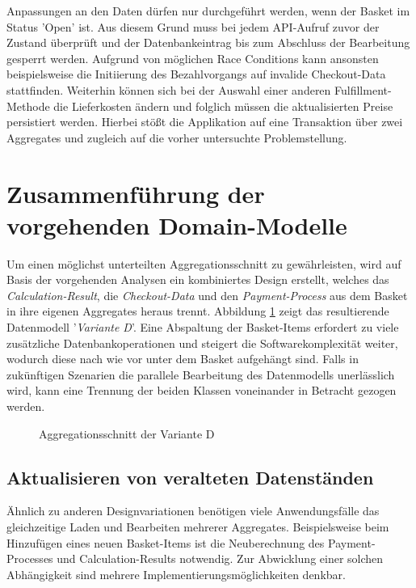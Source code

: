 Anpassungen an den Daten dürfen nur durchgeführt werden, wenn der Basket im Status 'Open' ist. Aus diesem Grund muss bei jedem API-Aufruf zuvor der Zustand überprüft und der Datenbankeintrag bis zum Abschluss der Bearbeitung gesperrt werden. Aufgrund von möglichen Race Conditions kann ansonsten beispielsweise die Initiierung des Bezahlvorgangs auf invalide Checkout-Data stattfinden. Weiterhin können sich bei der Auswahl einer anderen Fulfillment-Methode die Lieferkosten ändern und folglich müssen die aktualisierten Preise persistiert werden. Hierbei stößt die Applikation auf eine Transaktion über zwei Aggregates und zugleich auf die vorher untersuchte Problemstellung.

\pagebreak

\section{Zusammenführung der vorgehenden Domain-Modelle}

Um einen möglichst unterteilten Aggregationsschnitt zu gewährleisten, wird auf Basis der vorgehenden Analysen ein kombiniertes Design erstellt, welches das \emph{Calculation-Result}, die \emph{Checkout-Data} und den \emph{Payment-Process} aus dem Basket in ihre eigenen Aggregates heraus trennt. Abbildung \ref{fig:VarD} zeigt das resultierende Datenmodell '\emph{Variante D}'. Eine Abspaltung der Basket-Items erfordert zu viele zusätzliche Datenbankoperationen und steigert die Softwarekomplexität weiter, wodurch diese nach wie vor unter dem Basket aufgehängt sind. Falls in zukünftigen Szenarien die parallele Bearbeitung des Datenmodells unerlässlich wird, kann eine Trennung der beiden Klassen voneinander in Betracht gezogen werden.  

\begin{figure}[htbp]
	\centering
	
	\caption{Aggregationsschnitt der Variante D}
	\label{fig:VarD}
\end{figure}

\subsection{Aktualisieren von veralteten Datenständen}

Ähnlich zu anderen Designvariationen benötigen viele Anwendungsfälle das gleichzeitige Laden und Bearbeiten mehrerer Aggregates. Beispielsweise beim Hinzufügen eines neuen Basket-Items ist die Neuberechnung des Payment-Processes und Calculation-Results notwendig. Zur Abwicklung einer solchen Abhängigkeit sind mehrere Implementierungsmöglichkeiten denkbar. 


